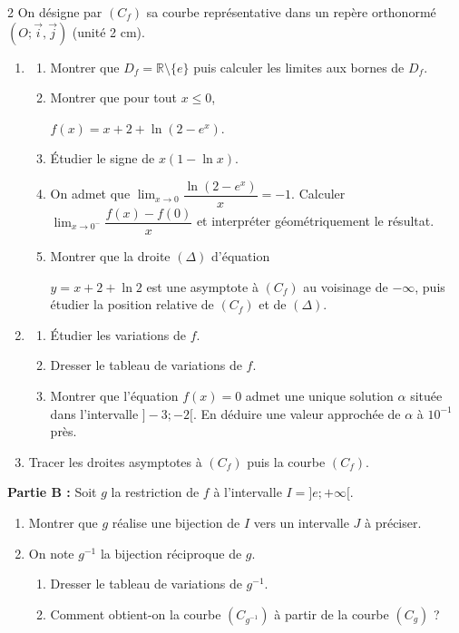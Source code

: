 \documentclass[12pt,a4paper]{article}
\begin{document}
\begin{multicols}{2}
On désigne par $(C_f)$ sa courbe représentative dans un repère orthonormé $(O;\vec{i},\vec{j})$ (unité 2 cm).

\begin{enumerate}
\item 
\begin{enumerate}
\item Montrer que $D_f=\mathbb{R}\setminus\{e\}$ puis calculer les limites aux bornes de $D_f$.
\item Montrer que pour tout $x\leq 0$,  

\( f(x)=x+2+\ln(2-e^x). \)
\item Étudier le signe de $x(1-\ln x)$.
\item On admet que  
\( \lim_{x\to 0}\dfrac{\ln(2-e^x)}{x}=-1. \)  
Calculer  
\( \lim_{x\to 0^{-}}\dfrac{f(x)-f(0)}{x} \)  
et interpréter géométriquement le résultat.
\item Montrer que la droite $(\Delta)$ d’équation

\( y=x+2+\ln 2 \) est une asymptote à $(C_f)$ au voisinage de $-\infty$, puis étudier la position relative de $(C_f)$ et de $(\Delta)$.
\end{enumerate}

\item 
\begin{enumerate}
\item Étudier les variations de $f$.
\item Dresser le tableau de variations de $f$.
\item Montrer que l’équation \( f(x)=0 \) admet une unique solution $\alpha$ située dans l’intervalle $]-3;-2[$.  
En déduire une valeur approchée de $\alpha$ à $10^{-1}$ près.
\end{enumerate}

\item Tracer les droites asymptotes à $(C_f)$ puis la courbe $(C_f)$.
\end{enumerate}

\textbf{Partie B :} Soit $g$ la restriction de $f$ à l’intervalle  
\( I=]e;+\infty[. \)

\begin{enumerate}
\item Montrer que $g$ réalise une bijection de $I$ vers un intervalle $J$ à préciser.
\item On note $g^{-1}$ la bijection réciproque de $g$.
\begin{enumerate}
\item Dresser le tableau de variations de $g^{-1}$.
\item Comment obtient-on la courbe $(C_{g^{-1}})$ à partir de la courbe $(C_g)$ ?
\end{enumerate}
\end{enumerate}


\end{multicols}
\end{document}
